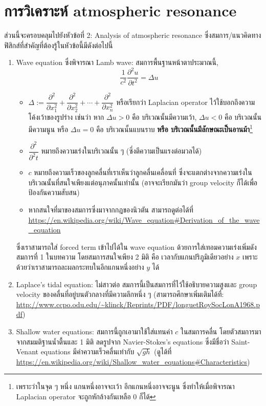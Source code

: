 \documentclass[a4paper, 12pt]{article}
\theoremstyle{plain} %
\begin{document}
\section{การวิเคราะห์ atmospheric resonance}
ส่วนนี้จะครอบคลุมไปยังหัวข้อที่ 2: Analysis of atmospheric resonance ซึ่งสมการ/แนวคิดทางฟิสิกส์ที่สำคัญที่ต้องรู้ในหัวข้อนี้มีดังต่อไปนี้
\begin{enumerate}
	\item Wave equation ซึ่งพิจารณา Lamb wave: สมการพื้นฐานหน้าตาประมาณนี้,
	$$\frac{1}{c^2}\frac{\partial^2 u}{\partial t^2} = \Delta u$$
	\begin{itemize}
		\item $\Delta := \dfrac{\partial^2}{\partial x_1^2} + \dfrac{\partial^2}{\partial x_2^2} + \cdots + \dfrac{\partial^2}{\partial x_n^2}$ หรือเรียกว่า Laplacian operator ไว้ใช้บอกถึงความโค้งเว้าของรูปร่าง เช่นว่า หาก $\Delta u > 0$ คือ บริเวณนั้นมีความเว้า, $\Delta u < 0$ คือ บริเวณนั้นมีความนูน หรือ $\Delta u = 0$ คือ บริเวณนั้นแบนราบ \textbf{หรือ บริเวณนั้นมีลักษณะเป็นอานม้า}\footnote{เพราะว่าในจุด ๆ หนึ่ง แกนหนึ่งอาจจะเว้า อีกแกนหนึ่งอาจจะนูน ซึ่งทำให้เมื่อพิจารณา Laplacian operator จะถูกหักล้างกันเหลือ 0 ก็ได้}
		\item $\dfrac{\partial^2}{\partial^2 t}$ หมายถึงความเร่งในบริเวณนั้น ๆ (ซึ่งตีความเป็นแรงต่อมวลได้)
		\item $c$ หมายถึงความเร็วของลูกคลื่นที่เราเห็นว่าลูกคลื่นเคลื่อนที่ ซึ่งจะแตกต่างจากความเร่งในบริเวณนั้นที่สนใจเพียงแต่อนุภาคนั้นเท่านั้น (อาจจะเรียกมันว่า group velocity ก็ได้เพื่อป้องกันความสับสน)
		\item หากสนใจที่มาของสมการซึ่งมาจากกฎของนิวตัน สามารถดูต่อได้ที่ \url{https://en.wikipedia.org/wiki/Wave_equation#Derivation_of_the_wave_equation}
	\end{itemize}
	ซึ่งเราสามารถใส่ forced term เข้าไปได้ใน wave equation ด้วยการใส่เทอมความเร่งเพิ่มดังสมการที่ 1 ในบทความ โดยสมการสนใจเพียง 2 มิติ คือ เวลากับแกนปริภูมิเดียวอย่าง $x$ เพราะด้วยว่าเราสามารถละผลกระทบในอีกแกนหนึ่งอย่าง $y$ ได้
	\item Laplace's tidal equation: ไม่สาวต่อ สมการนี้เป็นสมการที่ไว้ใช้อธิบายความสูงและ group velocity ของคลื่นที่อยู่บนตัวกลางที่มีความลึกหนึ่ง ๆ (สามารถศึกษาเพิ่มเติมได้ที่: \url{http://www.ccpo.odu.edu/~klinck/Reprints/PDF/longuetRoySocLonA1968.pdf})
	\item Shallow water equations: สมการนี้ถูกเอามาใช้ใส่แทนค่า $c$ ในสมการคลื่น โดยตัวสมการมาจากสมมติฐานน้ำตื้นและ 1 มิติ ลดรูปจาก Navier-Stokes's equations ซึ่งมีชื่อว่า Saint-Venant equations มีค่าความเร็วคลื่นเท่ากับ $\sqrt{gh}$ (ดูได้ที่ \url{https://en.wikipedia.org/wiki/Shallow\_water\_equations\#Characteristics})

\end{enumerate}
\end{document}
